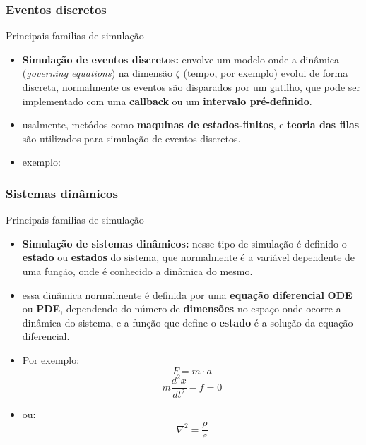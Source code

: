 \documentclass{beamer}
\begin{document}
	\subsubsection{Eventos discretos}
	\begin{frame}{Principais familias de simulação}
		\begin{itemize}[<+->]
			\item \textbf{Simulação de eventos discretos:} envolve um modelo onde a dinâmica (\emph{governing equations}) na dimensão $\zeta$ (tempo, por exemplo) evolui de forma discreta, normalmente os eventos são disparados por um gatilho, que pode ser implementado com uma \textbf{callback} ou um \textbf{intervalo pré-definido}.\cite{banks_discrete-event_2009}
			\item usalmente, metódos como \textbf{maquinas de estados-finitos}, e \textbf{teoria das filas} são utilizados para simulação de eventos discretos.
			\item exemplo:
			\centering
		\end{itemize}

	\end{frame}
	\subsubsection{Sistemas dinâmicos}
	\begin{frame}{Principais familias de simulação}
		\begin{itemize}[<+->]
			\item \textbf{Simulação de sistemas dinâmicos:} nesse tipo de simulação é definido o \textbf{estado} ou \textbf{estados} do sistema, que normalmente é a variável dependente de uma função, onde é conhecido a dinâmica do mesmo.
			\item essa dinâmica normalmente é definida por uma \textbf{equação diferencial} \textbf{ODE} ou \textbf{PDE}, dependendo do número de \textbf{dimensões} no espaço onde ocorre a dinâmica do sistema, e a função que define o \textbf{estado} é a solução da equação diferencial.\cite{quarteroni_numerical_2006}
			\item Por exemplo:
			\begin{equation}
				F = m \cdot a
			\end{equation}			
			\begin{equation}
				m\frac{d^2x}{dt^2} - f = 0
			\end{equation}
			\item ou:
			\begin{equation}
				\nabla^2=\frac{\rho}{\varepsilon}
			\end{equation}
		\end{itemize}
	\end{frame}
\end{document}
